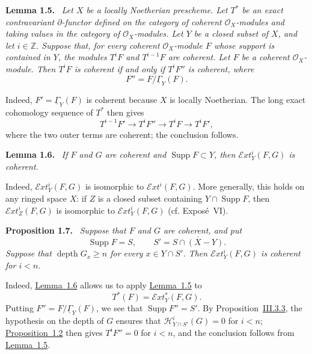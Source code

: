 \documentclass[11pt,a4paper,oneside]{book}
\providecommand{\sisi}[2]{#2}
\providecommand{\SheafGamma}{\underline{\Gamma}}
\providecommand{\SheafH}{\mathcal H}
\providecommand{\SheafExt}{\mathcal E\!xt}
\providecommand{\OX}{\mathcal O_X}
\providecommand{\Supp}{\operatorname{Supp}}
\providecommand{\depthop}{\operatorname{depth}}
\newenvironment{sgastatement}[1]
  {\par\addvspace{0.8\baselineskip}\noindent\textbf{#1.}\ \itshape}
  {\par\addvspace{0.35\baselineskip}}
\theoremstyle{plain}
\theoremstyle{definition}
\theoremstyle{remark}
\begin{document}
\begin{sgastatement}{Lemma 1.5}
Let $X$ be a locally Noetherian prescheme. Let $T^{\ast}$ be an exact
contravariant $\partial$-functor defined on the category of coherent
$\OX$-modules and taking values in the category of $\OX$-modules. Let $Y$ be a
closed subset of $X$, and let $i\in\mathbb Z$. Suppose that, for every coherent
$\OX$-module $F$ whose support is contained in $Y$, the modules $T^iF$ and
$T^{i-1}F$ are coherent. Let $F$ be a coherent $\OX$-module. Then $T^iF$ is
coherent if and only if $T^iF''$ is coherent, where
\[
  F''=F/\sisi{\Gamma}{\SheafGamma}_Y(F).
\]
\end{sgastatement}

Indeed, $F'=\sisi{\Gamma}{\SheafGamma}_Y(F)$ is coherent because $X$ is locally Noetherian. The
long exact cohomology sequence of $T^{\ast}$ then gives
\[
  T^{i-1}F'\longrightarrow T^iF''\longrightarrow T^iF
  \longrightarrow T^iF',
\]
where the two outer terms are coherent; the conclusion follows.

\begin{sgastatement}{Lemma 1.6}
If $F$ and $G$ are coherent and $\Supp F\subset Y$, then
$\SheafExt_Y^i(F,G)$ is coherent.
\end{sgastatement}

Indeed, $\SheafExt_Y^i(F,G)$ is isomorphic to $\SheafExt^i(F,G)$. More
generally, this holds on any ringed space $X$: if $Z$ is a closed subset
containing $Y\cap\Supp F$, then $\SheafExt_Z^i(F,G)$ is isomorphic to
$\SheafExt_Y^i(F,G)$ (cf. Expos\'e~VI).

\begin{sgastatement}{Proposition 1.7}
Suppose that $F$ and $G$ are coherent, and put
\[
  \Supp F=S,\qquad S'=\overline{S\cap(X-Y)}.
\]
Suppose that $\depthop G_x\geq n$ for every $x\in Y\cap S'$. Then
$\SheafExt_Y^i(F,G)$ is coherent for $i<n$.
\end{sgastatement}

Indeed, \hyperref[VII.1.6]{Lemma~1.6} allows us to apply \hyperref[VII.1.5]{Lemma~1.5} to
\[
  T^{\ast}(F)=\SheafExt_Y^{\ast}(F,G).
\]
Putting $F''=F/\sisi{\Gamma}{\SheafGamma}_Y(F)$, we see that $\Supp F''=S'$. By
Proposition~\hyperref[III.3.3]{III.3.3}, the hypothesis on the depth of $G$ ensures that
$\SheafH^i_{Y\cap S'}(G)=0$ for $i<n$; \hyperref[VII.1.2]{Proposition~1.2} then gives
$T^iF''=0$ for $i<n$, and the conclusion follows from \hyperref[VII.1.5]{Lemma~1.5}.
\end{document}
